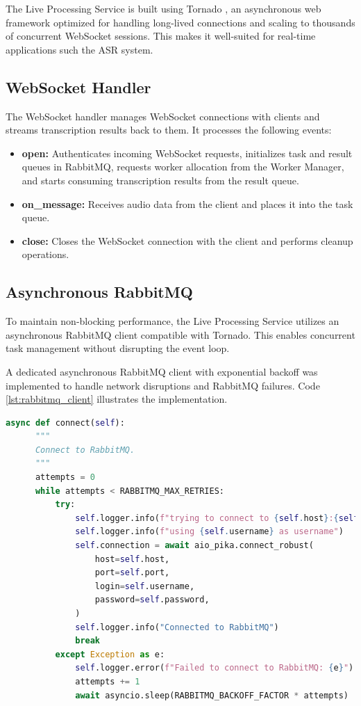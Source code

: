 The Live Processing Service is built using Tornado \cite{tornado}, an asynchronous web framework optimized for handling long-lived connections and scaling to thousands of concurrent WebSocket sessions. This makes it well-suited for real-time applications such the ASR system.

\subsection{WebSocket Handler}
The WebSocket handler manages WebSocket connections with clients and streams transcription results back to them. It processes the following events:

\begin{itemize}
    \item \textbf{open:} Authenticates incoming WebSocket requests, initializes task and result queues in RabbitMQ, requests worker allocation from the Worker Manager, and starts consuming transcription results from the result queue.
    \item \textbf{on\_message:} Receives audio data from the client and places it into the task queue.
    \item \textbf{close:} Closes the WebSocket connection with the client and performs cleanup operations.
\end{itemize}

\subsection{Asynchronous RabbitMQ}
To maintain non-blocking performance, the Live Processing Service utilizes an asynchronous RabbitMQ client compatible with Tornado. This enables concurrent task management without disrupting the event loop.

A dedicated asynchronous RabbitMQ client with exponential backoff was implemented to handle network disruptions and RabbitMQ failures. Code \ref{lst:rabbitmq_client} illustrates the implementation.

\begin{lstlisting}[language=python, caption={Asynchronous RabbitMQ Client}, label={lst:rabbitmq_client}]
async def connect(self):
      """
      Connect to RabbitMQ.
      """
      attempts = 0
      while attempts < RABBITMQ_MAX_RETRIES:
          try:
              self.logger.info(f"trying to connect to {self.host}:{self.port}")
              self.logger.info(f"using {self.username} as username")
              self.connection = await aio_pika.connect_robust(
                  host=self.host,
                  port=self.port,
                  login=self.username,
                  password=self.password,
              )
              self.logger.info("Connected to RabbitMQ")
              break
          except Exception as e:
              self.logger.error(f"Failed to connect to RabbitMQ: {e}")
              attempts += 1
              await asyncio.sleep(RABBITMQ_BACKOFF_FACTOR * attempts)
\end{lstlisting}

